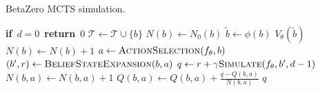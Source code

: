 \begin{algorithm}[H]
    \small
    \caption{BetaZero MCTS simulation.}
    \label{alg:betazero-mcts}
    \begin{algorithmic}[1]
         
            \State \textbf{if}\ $d=0$\ \textbf{return}\ $0$
                \State $\mathcal{T} \leftarrow \mathcal{T} \cup \{b\}$ 
                \State $N(b) \leftarrow N_0(b)$
                \State $\tilde{b} \leftarrow \phi(b)$ 
                \State \Return $V_\theta(\tilde{b})$  \label{line:mcts_lookup} 
            \EndIf
            \State $N(b) \leftarrow N(b) + 1$
            \State $a \leftarrow \textproc{ActionSelection}(f_\theta, b)$ \label{line:mcts_selection} 
            \State $(b^\prime, r) \leftarrow \textproc{BeliefStateExpansion}(b,a)$\label{line:mcts_expansion} 
            \State $q \leftarrow r + \gamma \textproc{Simulate}(f_\theta, b^\prime, d-1)$ \label{line:mcts_simulation} 
            \State $N(b,a) \leftarrow N(b,a)+1$
            \State $Q(b,a) \leftarrow Q(b,a)+\frac{q-Q(b,a)}{N(b,a)}$  \label{line:mcts_backprop} 
            \State \Return $q$
        \EndFunction
    \end{algorithmic}
\end{algorithm}
